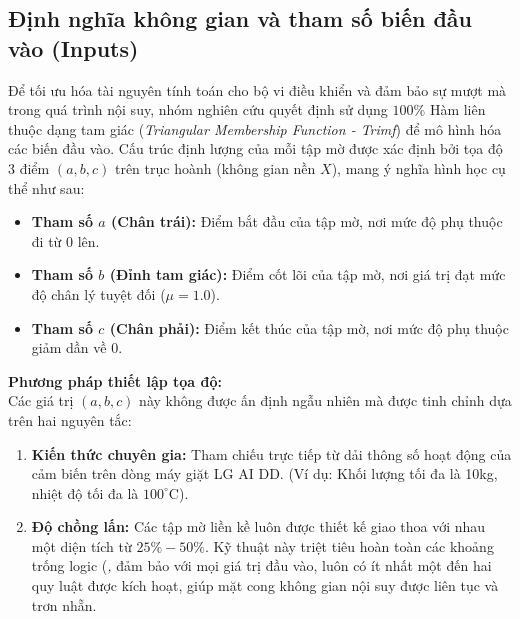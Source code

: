 \documentclass[12pt, a4paper]{article}
\begin{document}
\subsection{Định nghĩa không gian và tham số biến đầu vào (Inputs)}
Để tối ưu hóa tài nguyên tính toán cho bộ vi điều khiển và đảm bảo sự mượt mà trong quá trình nội suy, nhóm nghiên cứu quyết định sử dụng $100\%$ Hàm liên thuộc dạng tam giác (\textit{Triangular Membership Function - Trimf}) để mô hình hóa các biến đầu vào. Cấu trúc định lượng của mỗi tập mờ được xác định bởi tọa độ 3 điểm $(a, b, c)$ trên trục hoành (không gian nền $X$), mang ý nghĩa hình học cụ thể như sau:
\begin{itemize}
    \item \textbf{Tham số $a$ (Chân trái):} Điểm bắt đầu của tập mờ, nơi mức độ phụ thuộc đi từ $0$ lên.
    \item \textbf{Tham số $b$ (Đỉnh tam giác):} Điểm cốt lõi của tập mờ, nơi giá trị đạt mức độ chân lý tuyệt đối ($\mu = 1.0$).
    \item \textbf{Tham số $c$ (Chân phải):} Điểm kết thúc của tập mờ, nơi mức độ phụ thuộc giảm dần về $0$.
\end{itemize}

\textbf{Phương pháp thiết lập tọa độ:} \\
Các giá trị $(a, b, c)$ này không được ấn định ngẫu nhiên mà được tinh chỉnh dựa trên hai nguyên tắc:
\begin{enumerate}
    \item \textbf{Kiến thức chuyên gia:} Tham chiếu trực tiếp từ dải thông số hoạt động của cảm biến trên dòng máy giặt LG AI DD. (Ví dụ: Khối lượng tối đa là 10kg, nhiệt độ tối đa là $100^\circ$C).
    \item \textbf{Độ chồng lấn:} Các tập mờ liền kề luôn được thiết kế giao thoa với nhau một diện tích từ $25\% - 50\%$. Kỹ thuật này triệt tiêu hoàn toàn các khoảng trống logic (\textit, đảm bảo với mọi giá trị đầu vào, luôn có ít nhất một đến hai quy luật được kích hoạt, giúp mặt cong không gian nội suy được liên tục và trơn nhẵn.
\end{enumerate}
\end{document}
